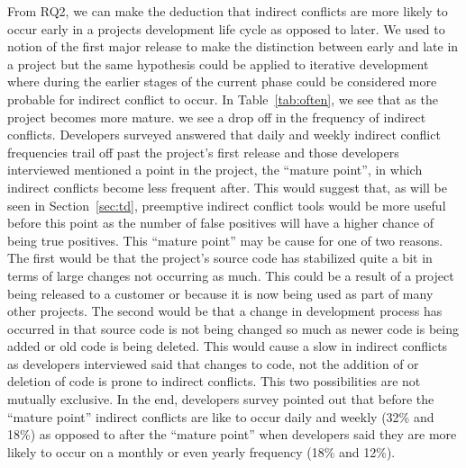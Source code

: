 \documentclass[conference]{IEEEtran}
\begin{document}
From RQ2, we can make the deduction that indirect conflicts are more likely to occur early in a projects development life cycle as opposed
to later. We used to notion of the first major release to make the distinction between early and late in a project but the same hypothesis
could be applied to iterative development where during the earlier stages of the current phase could be considered more probable for indirect
conflict to occur. In Table~\ref{tab:often}, we see that as the project becomes more mature. we see a drop off in the frequency of indirect
conflicts. Developers surveyed answered that daily and weekly indirect conflict frequencies trail off past the project's first release and 
those developers interviewed mentioned a point in the project, the ``mature point'', in which indirect conflicts become less frequent after.
This would suggest that, as will be seen in Section~\ref{sec:td}, preemptive indirect conflict tools would be more useful before this point as the
number of false positives will have a higher chance of being true positives. This ``mature point'' may be cause for one of two reasons. The
first would be that the project's source code has stabilized quite a bit in terms of large changes not occurring as much. This could be a result
of a project being released to a customer or because it is now being used as part of many other projects. The second would be that a change in
development process has occurred in that source code is not being changed so much as newer code is being added or old code is being deleted. This
would cause a slow in indirect conflicts as developers interviewed said that changes to code, not the addition of or deletion of code is prone
to indirect conflicts. This two possibilities are not mutually exclusive. In the end, developers survey pointed out that before the ``mature
point'' indirect conflicts are like to occur daily and weekly (32\% and 18\%) as opposed to after the ``mature point'' when developers
said they are more likely to occur on a monthly or even yearly frequency (18\% and 12\%).
\end{document}
